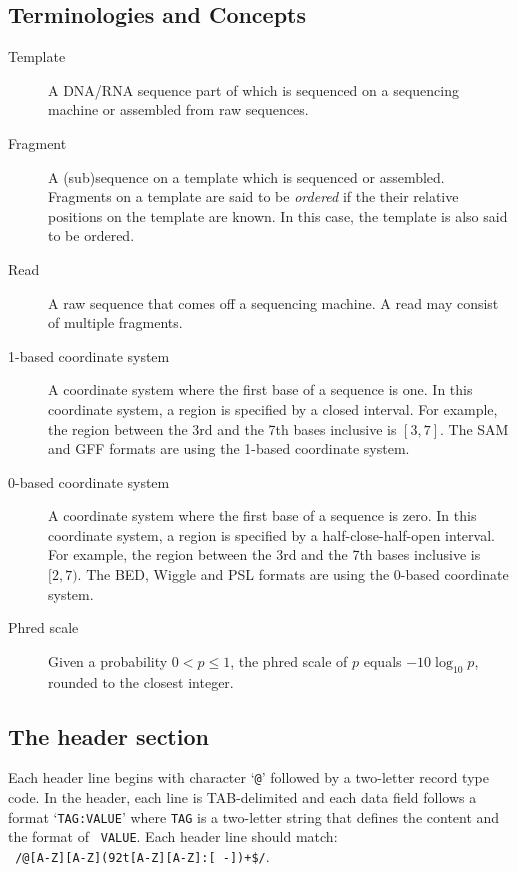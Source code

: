 \documentclass[10pt]{article}
\begin{document}
\subsection{Terminologies and Concepts}

\begin{description}
\item[Template] A DNA/RNA sequence part of which is sequenced on a
  sequencing machine or assembled from raw sequences.
\item[Fragment] A (sub)sequence on a template which is sequenced or
  assembled. Fragments on a template are said to be \emph{ordered} if
  the their relative positions on the template are known. In this case,
  the template is also said to be ordered.
\item[Read] A raw sequence that comes off a sequencing machine. A read
  may consist of multiple fragments.
\item[1-based coordinate system] A coordinate system where the first
  base of a sequence is one. In this coordinate system, a region is
  specified by a closed interval. For example, the region between the 3rd
  and the 7th bases inclusive is $[3,7]$. The SAM and GFF formats are
  using the 1-based coordinate system.
\item[0-based coordinate system] A coordinate system where the first
  base of a sequence is zero. In this coordinate system, a region is
  specified by a half-close-half-open interval. For example, the region
  between the 3rd and the 7th bases inclusive is $[2,7)$. The BED,
  Wiggle and PSL formats are using the 0-based coordinate system.
\item[Phred scale] Given a probability $0<p\le 1$, the phred scale of $p$
  equals $-10\log_{10}p$, rounded to the closest integer.
\end{description}

\subsection{The header section}
Each header line begins with character `{\tt @}' followed by a
two-letter record type code. In the header, each line is TAB-delimited
and each data field follows a format `{\tt TAG:VALUE}' where {\tt TAG}
is a two-letter string that defines the content and the format of {\tt
  VALUE}. Each header line should match:\\ {\tt
  /@[A-Z][A-Z](\char92t[A-Z][A-Z]:[ -])+\$/}.
\end{document}
